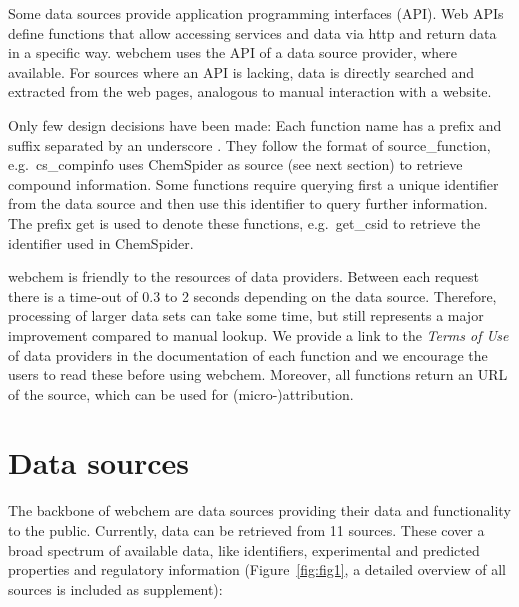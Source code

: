 Some data sources provide application programming interfaces (API).
Web APIs define functions that allow accessing services and data via http and return data in a specific way.
webchem uses the API of a data source provider, where available.
For sources where an API is lacking, data is directly searched and extracted from the web pages, analogous to manual interaction with a website.

Only few design decisions have been made:
Each function name has a prefix and suffix separated by an underscore \citep{Chamberlain_Szocs_2013}.
They follow the format of source\_function, e.g.\ cs\_compinfo uses ChemSpider as source (see next section) to retrieve compound information.
Some functions require querying first a unique identifier from the data source and then use this identifier to query further information.
The prefix get is used to denote these functions, e.g.\ get\_csid to retrieve the identifier used in ChemSpider.

webchem is friendly to the resources of data providers. 
Between each request there is a time-out of 0.3 to 2 seconds depending on the data source. 
Therefore, processing of larger data sets can take some time, but still represents a major improvement compared to manual lookup.
We provide a link to the \emph{Terms of Use} of data providers in the documentation of each function and we encourage the users to read these before using webchem.
Moreover, all functions return an URL of the source, which can be used for \mbox{(micro-)attribution}.


\section[Data sources]{Data sources}
The backbone of webchem are data sources providing their data and functionality to the public.
Currently, data can be retrieved from 11 sources.
These cover a broad spectrum of available data, like identifiers, experimental and predicted properties and regulatory information (Figure~\ref{fig:fig1}, a detailed overview of all sources is included as supplement):

